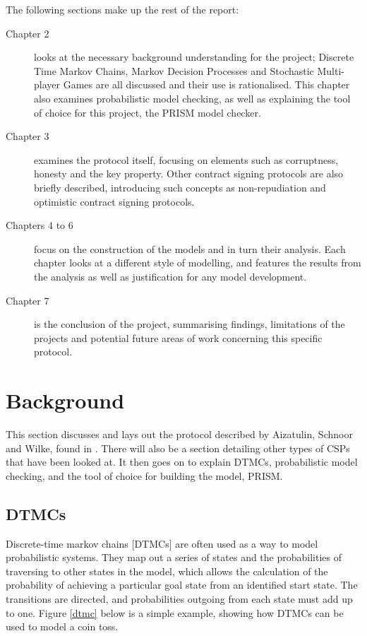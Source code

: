 \documentclass{l4proj}
\begin{document}
The following sections make up the rest of the report:
\begin{description}
\item[Chapter 2] looks at the necessary background understanding for the project; Discrete Time Markov Chains, Markov Decision Processes and Stochastic Multi-player Games are all discussed and their use is rationalised. This chapter also examines probabilistic model checking, as well as explaining the tool of choice for this project, the PRISM model checker.

\item[Chapter 3] examines the protocol itself, focusing on elements such as corruptness, honesty and the key property. Other contract signing protocols are also briefly described, introducing such concepts as non-repudiation and optimistic contract signing protocols.

\item[Chapters 4 to 6] focus on the construction of the models and in turn their analysis. Each chapter looks at a different style of modelling, and features the results from the analysis as well as justification for any model development.

\item[Chapter 7] is the conclusion of the project, summarising findings, limitations of the projects and potential future areas of work concerning this specific protocol.
\end{description}


\chapter{Background}
This section discusses and lays out the protocol described by Aizatulin, Schnoor and Wilke, found in \cite{ASW09}. There will also be a section detailing other types of CSPs that have been looked at. It then goes on to explain DTMCs, probabilistic model checking, and the tool of choice for building the model, PRISM.

\section{DTMCs}
Discrete-time markov chains [DTMCs] are often used as a way to model probabilistic systems. They map out a series of states and the probabilities of traversing to other states in the model, which allows the calculation of the probability of achieving a particular goal state from an identified start state. The transitions are directed, and probabilities outgoing from each state must add up to one. Figure \ref{dtmc} below is a simple example, showing how DTMCs can be used to model a coin toss.
\end{document}

